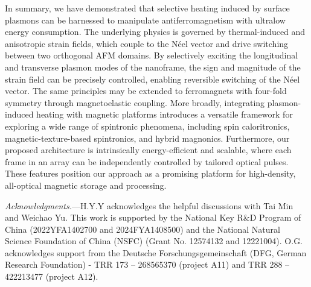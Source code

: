 \documentclass[aps,prl,reprint,floatfix,longbibliography,twocolumn]{revtex4-2}
\begin{document}
In summary, we have demonstrated that selective heating induced by surface plasmons can be harnessed to manipulate antiferromagnetism with ultralow energy consumption. The underlying physics is governed by thermal-induced and anisotropic strain fields, which couple to the Néel vector and drive switching between two orthogonal AFM domains. By selectively exciting the longitudinal and transverse plasmon modes of the nanoframe, the sign and magnitude of the strain field can be precisely controlled, enabling reversible switching of the Néel vector. The same principles may be extended to ferromagnets with four-fold symmetry through magnetoelastic coupling. More broadly, integrating plasmon-induced heating with magnetic platforms introduces a versatile framework for exploring a wide range of spintronic phenomena, including spin caloritronics, magnetic-texture-based spintronics, and hybrid magnonics. Furthermore, our proposed architecture is intrinsically energy-efficient and scalable, where each frame in an array can be independently controlled by tailored optical pulses. These features position our approach as a promising platform for high-density, all-optical magnetic storage and processing.


{\it Acknowledgments.}---H.Y.Y acknowledges the helpful discussions with Tai Min and Weichao Yu. This work is supported by the National Key R$\&$D Program of China (2022YFA1402700 and 2024FYA1408500) and the National Natural Science Foundation of China (NSFC) (Grant No. 12574132 and 12221004). O.G. acknowledges support from the Deutsche Forschungsgemeinschaft (DFG, German Research Foundation) - TRR 173 – 268565370 (project A11) and TRR 288 – 422213477 (project A12).
\end{document}

